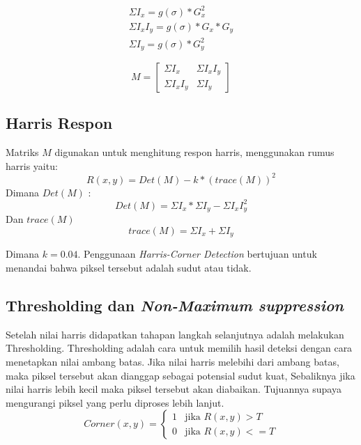 \begin{equation*}
    \begin{aligned}
        \Sigma I_{x} = g(\sigma) * G_{x}^2 \\
        \Sigma I_{x}I_{y} = g(\sigma) * G_{x} * G_{y} \\
        \Sigma I_{y} = g(\sigma) * G_{y}^2
    \end{aligned}
\end{equation*}

\begin{equation}
    M = 
    \begin{bmatrix}
        \Sigma I_{x} & \Sigma I_{x}I_{y} \\
        \Sigma I_{x}I_{y} & \Sigma I_{y}
    \end{bmatrix} 
\end{equation}

\subsection{Harris Respon}
    Matriks \(M\) digunakan untuk menghitung respon harris, menggunakan rumus harris yaitu:
\begin{equation}
    R(x,y) = Det(M) - k * (trace(M))^2
\end{equation}
Dimana \(Det(M)\) :
\begin{equation*}
    Det(M) = \Sigma I_{x} * \Sigma I_{y} - \Sigma I_{x}I_{y}^2
\end{equation*}
Dan \(trace(M)\) 
\begin{equation*}
    trace(M) = \Sigma I_{x} + \Sigma I_{y}
\end{equation*}

    Dimana \(k = 0.04\). Penggunaan \emph{Harris-Corner Detection} bertujuan untuk menandai bahwa piksel tersebut adalah sudut atau tidak.


\subsection{Thresholding dan \emph{Non-Maximum suppression}}
    Setelah nilai harris didapatkan tahapan langkah selanjutnya adalah melakukan Thresholding.
Thresholding adalah cara untuk memilih hasil deteksi dengan cara menetapkan nilai ambang batas.
Jika nilai harris melebihi dari ambang batas, maka piksel tersebut akan dianggap sebagai potensial sudut kuat, Sebaliknya jika nilai harris lebih kecil maka piksel tersebut akan diabaikan.
Tujuannya supaya mengurangi piksel yang perlu diproses lebih lanjut.
\begin{equation}
    Corner(x,y) = 
    \begin{cases}  
        1 & \text{jika } R(x,y) > T \\ 
        0 & \text{jika } R(x,y) <= T
    \end{cases}
\end{equation}

